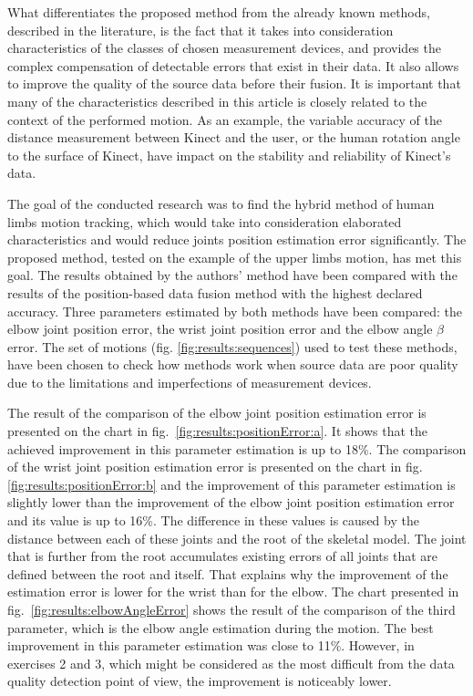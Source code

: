\documentclass[sensors,article,submit,moreauthors,pdftex,10pt,a4paper]{mdpi}
\begin{document}
What differentiates the proposed method from the already known methods, described in the literature, is the fact that it takes into consideration characteristics of the classes of chosen measurement devices, and provides the complex compensation of detectable errors that exist in their data. It also allows to improve the quality of the source data before their fusion. It is important that many of the characteristics described in this article is closely related to the context of the performed motion. As an example, the variable accuracy of the distance measurement between Kinect and the user, or the human rotation angle to the surface of Kinect, have impact on the stability and reliability of Kinect's data.
	
The goal of the conducted research was to find the hybrid method of human limbs motion tracking, which would take into consideration elaborated characteristics and would reduce joints position estimation error significantly. The proposed method, tested on the example of the upper limbs motion, has met this goal. The results obtained by the authors' method have been compared with the results of the position-based data fusion method with the highest declared accuracy. Three parameters estimated by both methods have been compared: the elbow joint position error, the wrist joint position error and the elbow angle $\beta$ error. The set of motions (fig. \ref{fig:results:sequences}) used to test these methods, have been chosen to check how methods work when source data are poor quality due to the limitations and imperfections of measurement devices.
	
The result of the comparison of the elbow joint position estimation error is presented on the chart in fig.~\ref{fig:results:positionError:a}. It shows that the achieved improvement in this parameter estimation is up to 18\%. The comparison of the wrist joint position estimation error is presented on the chart in fig. \ref{fig:results:positionError:b} and the improvement of this parameter estimation is slightly lower than the improvement of the elbow joint position estimation error and its value is up to 16\%. The difference in these values is caused by the distance between each of these joints and the root of the skeletal model. The joint that is further from the root accumulates existing errors of all joints that are defined between the root and itself. That explains why the improvement of the estimation error is lower for the wrist than for the elbow. The chart presented in fig.~\ref{fig:results:elbowAngleError} shows the result of the comparison of the third parameter, which is the elbow angle estimation during the motion. The best improvement in this parameter estimation was close to 11\%. However, in exercises 2 and 3, which might be considered as the most difficult from the data quality detection point of view, the improvement is noticeably lower.
	
\end{document}
